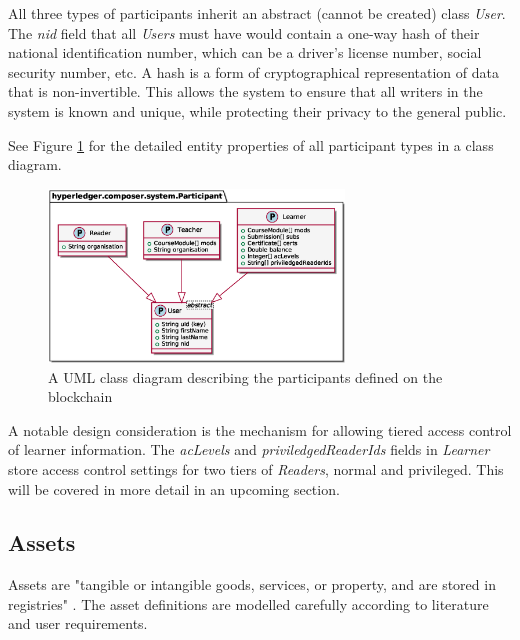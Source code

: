 All three types of participants inherit an abstract (cannot be created) class \textit{User}. The \textit{nid} field 
that all \textit{Users} must have would contain a one-way hash of their national identification number, which can be a 
driver's license number, social security number, etc. A hash is a form 
of cryptographical representation of data that is non-invertible. This allows the system to ensure that 
all writers in the system is known and unique, while protecting their privacy to the general public.

See Figure \ref{fig:participants} for the detailed entity properties of all participant types 
in a class diagram.

\begin{figure}[!ht] 
    \centering    
    \includegraphics[width=0.7\textwidth]{participants}
    \caption[Participants Class Diagram]
        {A UML class diagram describing the participants defined on the blockchain} 
    \label{fig:participants}
\end{figure}

A notable design consideration is the mechanism for allowing tiered access control of 
learner information. The \textit{acLevels} and \textit{priviledgedReaderIds} fields in \textit{Learner}
store access control settings for two tiers of \textit{Readers}, normal and privileged. 
This will be covered in more detail in an upcoming section.

\subsection{Assets}

Assets are "tangible or intangible goods, services, or property, and are stored in registries" \citep{official2018composer}.
The asset definitions are modelled carefully according to literature and user requirements.

